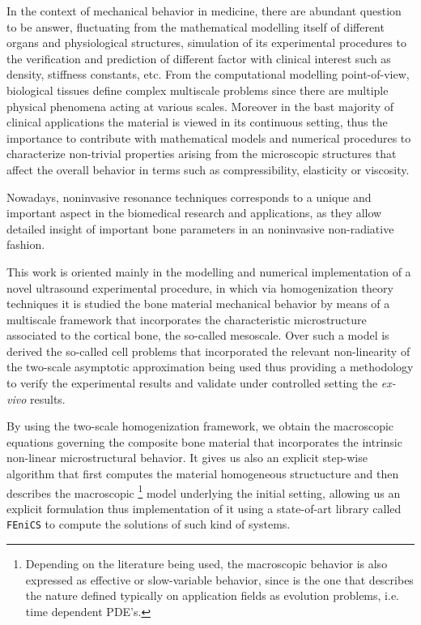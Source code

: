\begin{intro}
In the context of mechanical behavior in medicine, there are abundant question to be answer, fluctuating from the mathematical modelling itself of different organs and physiological structures, simulation of its experimental procedures to the verification and prediction of different factor with clinical interest such as density, stiffness constants, etc. From the computational modelling point-of-view, biological tissues define complex multiscale problems since there are multiple physical phenomena acting at various scales. Moreover in the bast majority of clinical applications the material is viewed in its continuous setting, thus the importance to contribute with mathematical models and numerical procedures to characterize non-trivial properties arising from the microscopic structures that affect the overall behavior in terms such as compressibility, elasticity or viscosity.

Nowadays, noninvasive resonance techniques corresponds to a unique and important aspect in the biomedical research and applications, as they allow detailed insight of important bone parameters in an noninvasive non-radiative fashion.

This work is oriented mainly in the modelling and numerical implementation of a novel ultrasound experimental procedure, in which via homogenization theory techniques it is studied the bone material mechanical behavior by means of a multiscale framework that incorporates the characteristic microstructure associated to the cortical bone, the so-called mesoscale.
Over such a model is derived the so-called cell problems that incorporated the relevant non-linearity of the two-scale asymptotic approximation being used thus providing a methodology to verify the experimental results and validate under controlled setting the \textit{ex-vivo} results.

By using the two-scale homogenization framework, we obtain the macroscopic equations governing the composite bone material that incorporates the intrinsic non-linear microstructural behavior.
It gives us also an explicit step-wise algorithm that first computes the material homogeneous structucture and then describes the macroscopic \footnote{Depending on the literature being used, the macroscopic behavior is also expressed as effective or slow-variable behavior, since is the one that describes the nature defined typically on application fields as evolution problems, i.e. time dependent PDE's.} model underlying the initial setting, allowing us an explicit formulation thus implementation of it using a state-of-art library called \texttt{FEniCS} to compute the solutions of such kind of systems.


\end{intro}
